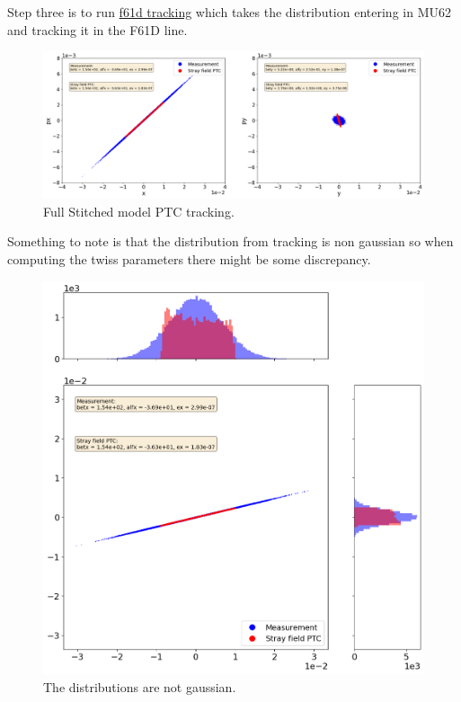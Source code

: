 Step three is to run \href{https://gitlab.cern.ch/eljohnso/stray-fields/-/blob/master/f61d_tracking.ipynb?ref_type=heads}{f61d tracking} which takes the distribution entering in MU62 and tracking it in the F61D line.

\begin{figure}[H]
\centering
\includegraphics[width=1.0\textwidth]{02_Simulation/images/full_stitching_PTC.png}
\caption{Full Stitched model PTC tracking.}
\label{fig:full_stitched_PTC}
\end{figure}

Something to note is that the distribution from tracking is non gaussian so when computing the twiss parameters there might be some discrepancy.

\begin{figure}[H]
\centering
\includegraphics[width=1.0\textwidth]{02_Simulation/images/non_gaussian.png}
\caption{The distributions are not gaussian.}
\label{fig:full_stitched_PTC}
\end{figure}

